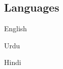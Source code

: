 \documentclass[]{deedy-resume-openfont}
\begin{document}
\begin{minipage}[t]{0.33\textwidth}
\subsection{Languages}
\vspace{\topsep}
\begin{tightemize}
\item English
\item Urdu
\item Hindi
\end{tightemize}


%
%

\end{minipage} 
\hfill
\end{document}
